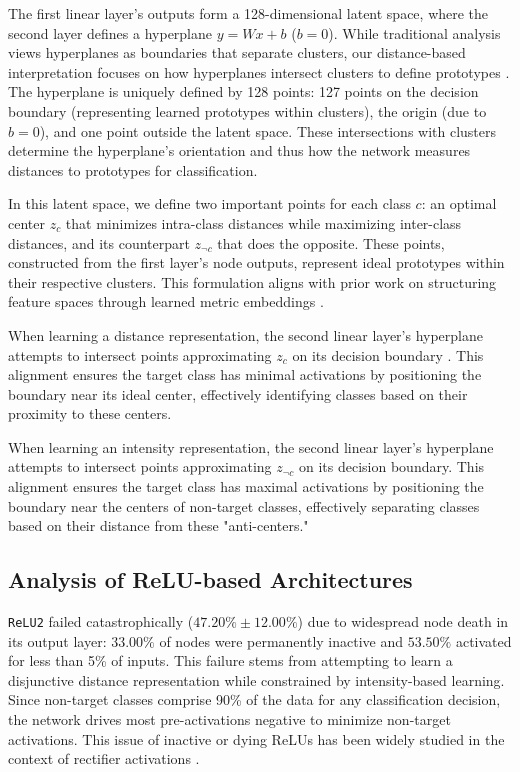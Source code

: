 The first linear layer's outputs form a 128-dimensional latent space, where the second layer defines a hyperplane $y=Wx+b$ ($b=0$). While traditional analysis views hyperplanes as boundaries that separate clusters, our distance-based interpretation focuses on how hyperplanes intersect clusters to define prototypes \cite{snell2017prototypical, weinberger2009distance}. The hyperplane is uniquely defined by 128 points: 127 points on the decision boundary (representing learned prototypes within clusters), the origin (due to $b=0$), and one point outside the latent space. These intersections with clusters determine the hyperplane's orientation and thus how the network measures distances to prototypes for classification.

In this latent space, we define two important points for each class $c$: an optimal center $z_c$ that minimizes intra-class distances while maximizing inter-class distances, and its counterpart $z_{\neg c}$ that does the opposite. These points, constructed from the first layer's node outputs, represent ideal prototypes within their respective clusters. This formulation aligns with prior work on structuring feature spaces through learned metric embeddings \cite{weinberger2009distance, xing2002distance}.

When learning a distance representation, the second linear layer's hyperplane attempts to intersect points approximating $z_c$ on its decision boundary \cite{oursland2024interpreting}. This alignment ensures the target class has minimal activations by positioning the boundary near its ideal center, effectively identifying classes based on their proximity to these centers. 

When learning an intensity representation, the second linear layer's hyperplane attempts to intersect points approximating $z_{\neg c}$ on its decision boundary. This alignment ensures the target class has maximal activations by positioning the boundary near the centers of non-target classes, effectively separating classes based on their distance from these "anti-centers."

\subsection{Analysis of ReLU-based Architectures}

\texttt{ReLU2} failed catastrophically ($47.20\% \pm 12.00\%$) due to widespread node death in its output layer: $33.00\%$ of nodes were permanently inactive and $53.50\%$ activated for less than 5\% of inputs. This failure stems from attempting to learn a disjunctive distance representation while constrained by intensity-based learning. Since non-target classes comprise 90\% of the data for any classification decision, the network drives most pre-activations negative to minimize non-target activations. This issue of inactive or dying ReLUs has been widely studied in the context of rectifier activations \cite{he2015delving}.

